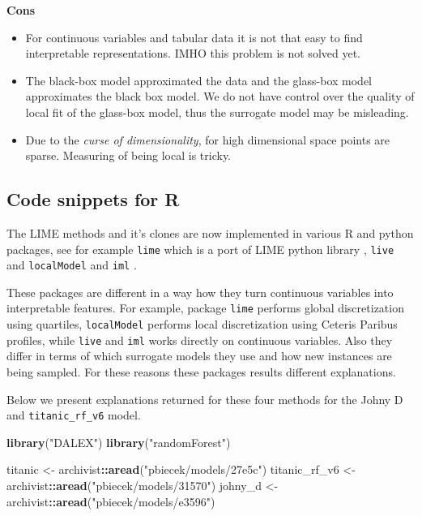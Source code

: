 \documentclass[12pt,]{krantz}
\newenvironment{Shaded}{\begin{snugshade}}{\end{snugshade}}
\newcommand{\KeywordTok}[1]{\textcolor[rgb]{0.13,0.29,0.53}{\textbf{#1}}}
\newcommand{\NormalTok}[1]{#1}
\newcommand{\OperatorTok}[1]{\textcolor[rgb]{0.81,0.36,0.00}{\textbf{#1}}}
\newcommand{\StringTok}[1]{\textcolor[rgb]{0.31,0.60,0.02}{#1}}
\providecommand{\tightlist}{%
  \setlength{\itemsep}{0pt}\setlength{\parskip}{0pt}}
\theoremstyle{definition}
\theoremstyle{definition}
\theoremstyle{definition}
\theoremstyle{remark}
\begin{document}
\textbf{Cons}

\begin{itemize}
\tightlist
\item
  For continuous variables and tabular data it is not that easy to find
  interpretable representations. IMHO this problem is not solved yet.
\item
  The black-box model approximated the data and the glass-box model
  approximates the black box model. We do not have control over the
  quality of local fit of the glass-box model, thus the surrogate model
  may be misleading.
\item
  Due to the \emph{curse of dimensionality}, for high dimensional space
  points are sparse. Measuring of being local is tricky.
\end{itemize}

\hypertarget{code-snippets-for-r-3}{%
\subsection{Code snippets for R}\label{code-snippets-for-r-3}}

The LIME methods and it's clones are now implemented in various R and
python packages, see for example \texttt{lime} \citep{R-lime} which is a
port of LIME python library \citep{shapPackage}, \texttt{live}
\citep{R-live} and \texttt{localModel} \citep{localModelPackage} and
\texttt{iml} \citep{imlRPackage}.

These packages are different in a way how they turn continuous variables
into interpretable features. For example, package \texttt{lime} performs
global discretization using quartiles, \texttt{localModel} performs
local discretization using Ceteris Paribus profiles, while \texttt{live}
and \texttt{iml} works directly on continuous variables. Also they
differ in terms of which surrogate models they use and how new instances
are being sampled. For these reasons these packages results different
explanations.

Below we present explanations returned for these four methods for the
Johny D and \texttt{titanic\_rf\_v6} model.

\begin{Shaded}
\begin{Highlighting}[]
\KeywordTok{library}\NormalTok{(}\StringTok{"DALEX"}\NormalTok{)}
\KeywordTok{library}\NormalTok{(}\StringTok{"randomForest"}\NormalTok{)}

\NormalTok{titanic <-}\StringTok{ }\NormalTok{archivist}\OperatorTok{::}\KeywordTok{aread}\NormalTok{(}\StringTok{"pbiecek/models/27e5c"}\NormalTok{)}
\NormalTok{titanic_rf_v6 <-}\StringTok{ }\NormalTok{archivist}\OperatorTok{::}\KeywordTok{aread}\NormalTok{(}\StringTok{"pbiecek/models/31570"}\NormalTok{)}
\NormalTok{johny_d <-}\StringTok{ }\NormalTok{archivist}\OperatorTok{::}\KeywordTok{aread}\NormalTok{(}\StringTok{"pbiecek/models/e3596"}\NormalTok{)}
\end{Highlighting}
\end{Shaded}
\end{document}
